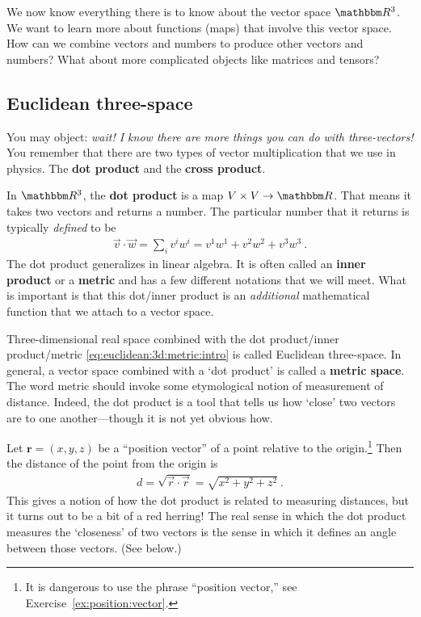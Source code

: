 \documentclass[12pt]{article}
\begin{document}
We now know everything there is to know about the vector space $\RR ^3$. We want to learn more about functions (maps) that involve this vector space. How can we combine vectors and numbers to produce other vectors and numbers? What about more complicated objects like matrices and tensors? 


\subsection{Euclidean three-space}

You may object: \emph{wait! I know there are more things you can do with three-vectors!} You remember that there are two types of vector multiplication that we use in physics. The \textbf{dot product} and the \textbf{cross product}. 

In $\RR ^3$, the \textbf{dot product} is a map $V\times V \to \RR $. That means it takes two vectors and returns a number. The particular number that it returns is typically \emph{defined} to be
\begin{align}
    \vec{v} \cdot \vec{w} 
    = \sum_i v^i w^i  
    = v^1w^1 + v^2 w^2 + v^3w^3 \ .
    \label{eq:euclidean:3d:metric:intro}
\end{align}
The dot product generalizes in linear algebra. It is often called an \textbf{inner product} or a \textbf{metric} and has a few different notations that we will meet. What is important is that this dot/inner product is an \emph{additional} mathematical function that we attach to a vector space. 

Three-dimensional real space combined with the dot product/inner product/metric \eqref{eq:euclidean:3d:metric:intro} is called Euclidean three-space. In general, a vector space combined with a `dot product' is called a \textbf{metric space}. The word metric should invoke some etymological notion of measurement of distance. Indeed, the dot product is a tool that tells us how `close' two vectors are to one another---though it is not yet obvious how.

\begin{example}
Let $\mathbf{r}=(x,y,z)$ be a ``position vector'' of a point relative to the origin.\footnote{It is dangerous to use the phrase ``position vector,'' see Exercise~\ref{ex:position:vector}.} Then the distance of the point from the origin is
\begin{align}
    d = \sqrt{\vec{r}\cdot\vec{r}} =
    \sqrt{x^2+y^2 +z^2} \ .
    \label{eq:distance:in:space}
\end{align}
This gives a notion of how the dot product is related to measuring distances, but it turns out to be a bit of a red herring! The real sense in which the dot product measures the `closeness' of two vectors is the sense in which it defines an angle between those vectors. (See below.)
\end{example}
\end{document}
